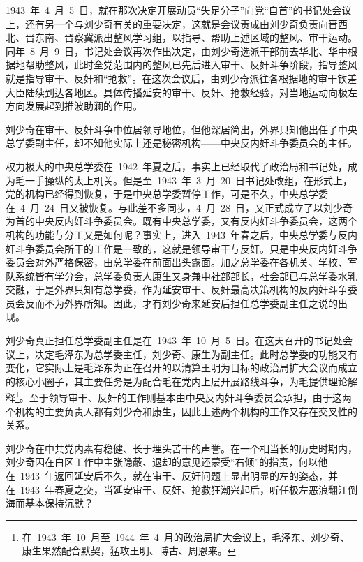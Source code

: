 1943~年~4~月~5~日，就在那次决定开展动员“失足分子”向党“自首”的书记处会议上，还有另一个与刘少奇有关的重要决定，这就是会议责成由刘少奇负责向晋西北、晋东南、晋察冀派出整风学习组，以指导、帮助上述区域的整风、审干运动。同年~8~月~9~日，书记处会议再次作出决定，由刘少奇选派干部前去华北、华中根据地帮助整风，此时全党范围内的整风已先后进入审干、反奸斗争阶段，指导整风就是指导审干、反奸和“抢救”。在这次会议后，由刘少奇派往各根据地的审干钦差大臣陆续到达各地区。具体传播延安的审干、反奸、抢救经验，对当地运动向极左方向发展起到推波助澜的作用。

刘少奇在审干、反奸斗争中位居领导地位，但他深居简出，外界只知他出任了中央总学委副主任，却不知他实际上还是秘密机构——中央反内奸斗争委员会的主任。

权力极大的中央总学委在~1942~年夏之后，事实上已经取代了政治局和书记处，成为毛一手操纵的太上机关。但是至~1943~年~3~月~20~日书记处改组，在形式上，党的机构已经得到恢复，于是中央总学委暂停工作，可是不久，中央总学委在~4~月~24~日又被恢复。与此差不多同步，4~月~28~日，又正式成立了以刘少奇为首的中央反内奸斗争委员会。既有中央总学委，又有反内奸斗争委员会，这两个机构的功能与分工又是如何呢？事实上，进入~1943~年春之后，中央总学委与反内奸斗争委员会所干的工作是一致的，这就是领导审干与反奸。只是中央反内奸斗争委员会对外严格保密，由总学委在前面出头露面。加之总学委在各机关、学校、军队系统皆有学分会，总学委负责人康生又身兼中社部部长，社会部已与总学委水乳交融，于是外界只知有总学委，作为延安审干、反奸最高决策机构的反内奸斗争委员会反而不为外界所知。因此，才有刘少奇来延安后担任总学委副主任之说的出现。

刘少奇真正担任总学委副主任是在~1943~年~10~月~5~日。在这天召开的书记处会议上，决定毛泽东为总学委主任，刘少奇、康生为副主任。此时总学委的功能又有变化，它实际上是毛泽东为正在召开的以清算王明为目标的政治局扩大会议而成立的核心小圈子，其主要任务是为配合毛在党内上层开展路线斗争，为毛提供理论解释\footnote{在~1943~年~10~月至~1944~年~4~月的政治局扩大会议上，毛泽东、刘少奇、康生果然配合默契，猛攻王明、博古、周恩来。}。至于领导审干、反奸的工作则基本由中央反内奸斗争委员会承担，由于这两个机构的主要负责人都有刘少奇和康生，因此上述两个机构的工作又存在交叉性的关系。

刘少奇在中共党内素有稳健、长于埋头苦干的声誉。在一个相当长的历史时期内，刘少奇因在白区工作中主张隐蔽、退却的意见还蒙受“右倾”的指责，何以他在~1943~年返回延安后不久，就在审干、反奸问题上显出明显的左的姿态，并在~1943~年春夏之交，当延安审干、反奸、抢救狂潮兴起后，听任极左恶浪翻江倒海而基本保持沉默？

